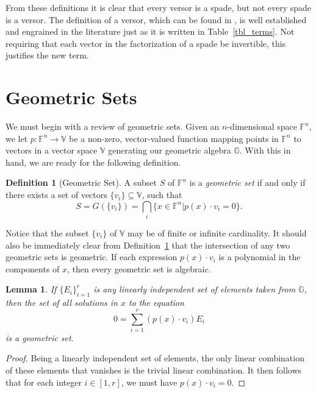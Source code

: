 \documentclass{birkjour}
\newtheorem{lem}[thm]{Lemma}
\theoremstyle{definition}
\newtheorem{defn}[thm]{Definition}
\theoremstyle{remark}
\numberwithin{equation}{section}
\newcommand{\F}{\mathbb{F}}
\newcommand{\G}{\mathbb{G}}
\newcommand{\V}{\mathbb{V}}
\begin{document}
From these definitions it is clear that every versor is a spade, but not every spade is a versor.  The definition of a versor,
which can be found in \cite[p. 90]{Perwass09}, is well established and engrained in the literature just as it is written in Table~\ref{tbl_terms}.  Not requiring
that each vector in the factorization of a spade be invertible, this justifies the new term.

\section{Geometric Sets}

We must begin with a review of geometric sets.  Given an $n$-dimensional space $\F^n$, we let $p:\F^n\to\V$ be a non-zero, vector-valued
function mapping points in $\F^n$ to vectors in a vector space $\V$ generating our geometric algebra $\G$.  With this in hand,
we are ready for the following definition.
\begin{defn}[Geometric Set]\label{def_geo_set}
A subset $S$ of $\F^n$ is a \emph{geometric set} if and only if there exists a set of vectors $\{v_i\}\subseteq\V$, such that
\begin{equation}\label{equ_geo_set_def}
S = G(\{v_i\}) = \bigcap_i \{x\in\F^n|p(x)\cdot v_i=0\}.
\end{equation}
\end{defn}
Notice that the subset $\{v_i\}$ of $\V$ may be of finite or infinite cardinality.  It should also be immediately clear
from Definition~\ref{def_geo_set} that the intersection of any two geometric sets is geometric.
If each expression $p(x)\cdot v_i$ is a polynomial in the components of $x$, then every geometric set is algebraic.

\begin{lem}\label{lem_geo_set_lin_indep}
If $\{E_i\}_{i=1}^r$ is any linearly independent set of elements taken from $\G$, then the set of all
solutions in $x$ to the equation
\begin{equation}\label{equ_geo_set}
0 = \sum_{i=1}^r (p(x)\cdot v_i)E_i
\end{equation}
is a geometric set.
\end{lem}
\begin{proof}
Being a linearly independent set of elements, the only linear combination of these elements that vanishes is the trivial linear combination.
It then follows that for each integer $i\in[1,r]$, we must have $p(x)\cdot v_i=0$.
\end{proof}
\end{document}
